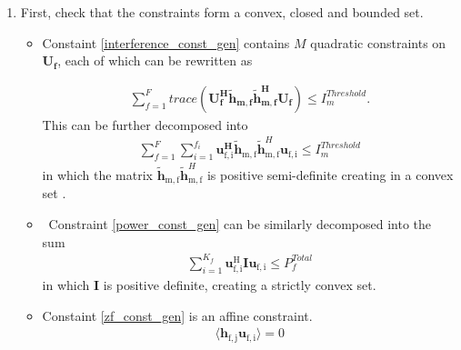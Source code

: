 \documentclass[12pt,a4paper]{report}
\begin{document}
\begin{enumerate}


\item
First, check that the constraints form a convex, closed and bounded set. 

\begin{itemize}

\item
	Constaint \eqref{interference_const_gen} contains $M$ quadratic constraints on $\mathbf{U_f}$, each of which 
	can be rewritten  as

\begin{gather*}
	\sum_{f=1}^F
	trace(\mathbf{U_f^H} \mathbf{\tilde{h}_{m,f}} \mathbf{\tilde{h}_{m,f}^H} \mathbf{U_f} )\leq 
	I^{Threshold}_{m}.
\end{gather*}
This can be further decomposed into  
	\begin{gather*}
	\sum_{f=1}^F
	\sum_{i=1}^{f_i}
	\mathbf{u_{\mathrm{f,i}}^H}\mathbf{\tilde{h}_{\mathrm{m,f}}} \mathbf{\tilde{h}}_{\mathrm{m,f}}^H
	\mathbf{u_{\mathrm{f,i}}} \leq I^{Threshold}_{m}
	\end{gather*}
in which the matrix $ \mathbf{\tilde{h}_{\mathrm{m,f}}} \mathbf{\tilde{h}}_{\mathrm{m,f}}^H$ is  positive semi-definite creating in a convex set 
\cite[p.~8,9]{BoV:04}. 


\item \
	Constraint \eqref{power_const_gen} can be similarly decomposed into the sum
	\begin{gather*}
		\sum_{i=1}^{K_f}\mathbf{u_{\mathrm{f,i}}^{\mathrm{H}}} \mathbf{I} 		
		\mathbf{u_{\mathrm{f,i}}} \leq  P^{Total}_{f}
	\end{gather*}
	in which $\mathbf{I}$ is positive definite, creating a strictly convex set.

\item 
	Constaint \eqref{zf_const_gen} is an affine constraint. 
		\begin{gather*}
		\langle \mathbf{h_{\mathrm{f,j}}}\mathbf{u_{\mathrm{f,i}}} \rangle =0
		\end{gather*}
\end{itemize}



\end{enumerate}
\end{document}
